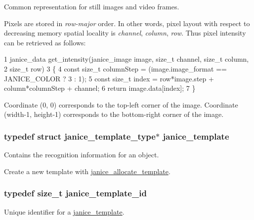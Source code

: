 Common representation for still images and video frames. 

Pixels are stored in {\itshape row-\/major} order. In other words, pixel layout with respect to decreasing memory spatial locality is {\itshape channel}, {\itshape column}, {\itshape row}. Thus pixel intensity can be retrieved as follows\+:


\begin{DoxyCode}
1 janice\_data get\_intensity(janice\_image image, size\_t channel, size\_t column,
2                                                                      size\_t row)
3 \{
4     const size\_t columnStep = (image.image\_format == JANICE\_COLOR ? 3 : 1);
5     const size\_t index = row*image.step + column*columnStep + channel;
6     return image.data[index];
7 \}
\end{DoxyCode}


Coordinate (0, 0) corresponds to the top-\/left corner of the image. Coordinate (width-\/1, height-\/1) corresponds to the bottom-\/right corner of the image. \hypertarget{group__janice_ga5593b06e86b90504968c0fc191ee2f3c}{}
\subsubsection[{janice\+\_\+template}]{\setlength{\rightskip}{0pt plus 5cm}typedef struct janice\+\_\+template\+\_\+type$\ast$ {\bf janice\+\_\+template}}\label{group__janice_ga5593b06e86b90504968c0fc191ee2f3c}


Contains the recognition information for an object. 

Create a new template with \hyperlink{group__janice_ga5709bc7f0fd329db20f72cac8639c328}{janice\+\_\+allocate\+\_\+template}. \hypertarget{group__janice_ga5ec62465fbbc7a92faadfefd3d20e25b}{}
\subsubsection[{janice\+\_\+template\+\_\+id}]{\setlength{\rightskip}{0pt plus 5cm}typedef size\+\_\+t {\bf janice\+\_\+template\+\_\+id}}\label{group__janice_ga5ec62465fbbc7a92faadfefd3d20e25b}


Unique identifier for a \hyperlink{group__janice_ga5593b06e86b90504968c0fc191ee2f3c}{janice\+\_\+template}. 

